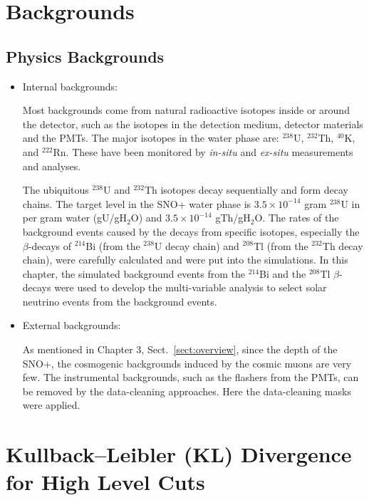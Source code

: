\section{Backgrounds}
\subsection{Physics Backgrounds}

\begin{itemize}
\item Internal backgrounds:

Most backgrounds come from natural radioactive isotopes inside or around the detector, such as the isotopes in the detection medium, detector materials and the PMTs. The major isotopes in the water phase are: $^{238}$U, $^{232}$Th, $^{40}$K, and $^{222}$Rn. These have been monitored by \emph{in-situ} and \emph{ex-situ} measurements and analyses. 

The ubiquitous $^{238}$U and $^{232}$Th isotopes decay sequentially and form decay chains. 
The target level in the SNO+ water phase is $3.5\times 10^{-14}$ gram $^{238}$U in per gram water (gU/gH$_2$O) and $3.5\times 10^{-14}$ gTh/gH$_2$O\cite{waterunidoc}. The rates of the background events caused by the decays from specific isotopes, especially the $\beta$-decays of $^{214}$Bi (from the $^{238}$U decay chain) and $^{208}$Tl (from the $^{232}$Th decay chain), were carefully calculated and were put into the simulations. In this chapter, the simulated background events from the $^{214}$Bi and the $^{208}$Tl $\beta$-decays were used to develop the multi-variable analysis to select solar neutrino events from the background events.

\item External backgrounds:

As mentioned in Chapter 3, Sect.~\ref{sect:overview}, since the depth of the SNO+, the cosmogenic backgrounds induced by the cosmic muons are very few. 
The instrumental backgrounds, such as the flashers from the PMTs, can be removed by the data-cleaning approaches. Here the data-cleaning masks were applied.
\end{itemize}

\section{Kullback–Leibler (KL) Divergence for High Level Cuts}

